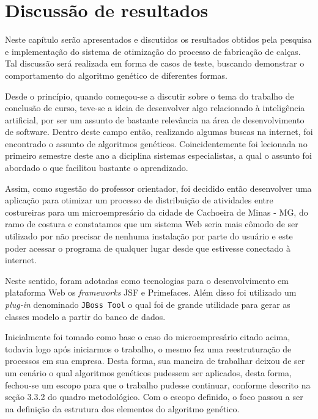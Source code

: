 \chapter{Discussão de resultados}

\par Neste capítulo serão apresentados e discutidos os resultados obtidos pela pesquisa e implementação 
do sistema de otimização do processo de fabricação de calças. Tal discussão será realizada em forma de
casos de teste, buscando demonstrar o comportamento do algoritmo genético de diferentes formas.

\par Desde o princípio, quando começou-se a discutir sobre o tema do 
trabalho de conclusão de curso, teve-se a ideia de desenvolver algo relacionado
à inteligência artificial, por ser um assunto de bastante relevância na área de desenvolvimento de software. 
Dentro deste campo então, realizando algumas buscas na internet, foi encontrado
o assunto de algoritmos genéticos.
Coincidentemente foi lecionada no primeiro semestre deste ano a diciplina
sistemas especialistas, a qual o assunto foi abordado o que facilitou bastante o aprendizado.

\par Assim, como sugestão do professor orientador, foi decidido então
desenvolver uma aplicação para otimizar um processo de distribuição de atividades entre
costureiras para um microempresário da cidade de Cachoeira de Minas - MG, do ramo de costura e constatamos 
que um sistema Web seria mais cômodo de ser utilizado por não precisar de
nenhuma instalação por parte do usuário e este poder acessar o programa de
qualquer lugar desde que estivesse conectado à internet.

Neste sentido, foram adotadas como tecnologias para o desenvolvimento em
plataforma Web os \textit{frameworks} JSF e Primefaces. Além disso foi utilizado
um \textit{plug-in} denominado \texttt{JBoss Tool} o qual foi de grande utilidade para gerar as classes 
modelo a partir do banco de dados.

\par Inicialmente foi tomado como base o caso do microempresário citado acima,
todavia logo após iniciarmos o trabalho, o mesmo fez uma reestruturação de processos em sua empresa. 
Desta forma, sua maneira de trabalhar deixou de ser um cenário o qual algoritmos genéticos
pudessem ser aplicados, desta forma, fechou-se um escopo para que o trabalho
pudesse continuar, conforme descrito na seção 3.3.2 do quadro metodológico. Com
o escopo definido, o foco passou a ser na definição da estrutura dos elementos do algoritmo genético.

